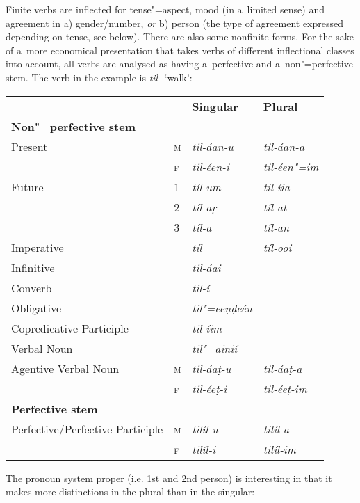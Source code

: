 Finite verbs are inflected for tense"=aspect, mood (in a~limited sense) and agreement in a)
gender/number, \textit{or} b) person (the type of agreement expressed depending on tense, see 
below). There are also some nonfinite forms. For the sake of a~more economical presentation that
takes verbs of different inflectional classes into account, all verbs are analysed as having
a~perfective and a~non"=perfective stem. The verb in the example is \textit{til-} `walk':


\begin{table}[H]
\begin{tabular}{ l l l l }
&
&
\textbf{Singular} &
\textbf{Plural} \\
\textbf{Non"=perfective stem} &
&
&
\\
Present &
\textsc{m} &
\textit{til-áan-u} &
\textit{til-áan-a} \\
&
\textsc{f} &
\textit{til-éen-i} &
\textit{til-éen"=im} \\
Future &
1 &
\textit{tíl-um} &
\textit{til-íia} \\
&
2 &
\textit{tíl-aṛ} &
\textit{tíl-at} \\
&
3 &
\textit{tíl-a} &
\textit{tíl-an} \\
Imperative &
&
\textit{tíl} &
\textit{tíl-ooi} \\
Infinitive &
&
\textit{til-áai} &
\\
Converb &
&
\textit{til-í} &
\\
Obligative &
&
\textit{til"=eeṇḍeéu} &
\\
Copredicative Participle &
&
\textit{til-íim} &
\\
Verbal Noun &
&
\textit{til"=ainií} &
\\
Agentive Verbal Noun &
\textsc{m} &
\textit{til-áaṭ-u} &
\textit{til-áaṭ-a} \\
&
\textsc{f} &
\textit{til-éeṭ-i} &
\textit{til-éeṭ-im} \\
\textbf{Perfective stem} &
&
&
\\
Perfective/Perfective Participle &
\textsc{m} &
\textit{tilíl-u} &
\textit{tilíl-a} \\
&
\textsc{f} &
\textit{tilíl-i} &
\textit{tilíl-im} \\
\end{tabular}
\end{table}

The pronoun system proper (i.e. 1st and 2nd person) is interesting in that it makes more distinctions in the plural than in the singular:

